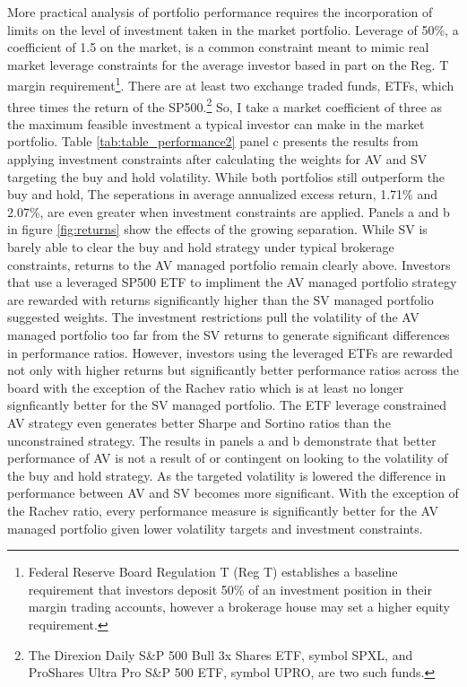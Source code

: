 More practical analysis of portfolio performance requires the incorporation of limits on the level of investment taken in the market portfolio. Leverage of 50\%, a coefficient of 1.5 on the market, is a common constraint meant to mimic real market leverage constraints for the average investor based in part on the Reg. T margin requirement\footnote{Federal Reserve Board Regulation T (Reg T) establishes a baseline requirement that investors deposit 50\% of an investment position in their margin trading accounts, however a brokerage house may set a higher equity requirement.}. \citep{Rapach2016,moreira_volatility-managed_2017,deuskar_margin_2017} There are at least two exchange traded funds, ETFs, which three times the return of the SP500.\footnote{The Direxion Daily S\&P 500 Bull 3x Shares ETF, symbol SPXL, and ProShares Ultra Pro S\&P 500 ETF, symbol UPRO, are two such funds.} So, I take a market coefficient of three as the maximum feasible investment a typical investor can make in the market portfolio. Table \ref{tab:table_performance2} panel c presents the results from applying investment constraints after calculating the weights for AV and SV targeting the buy and hold volatility. While both portfolios still outperform the buy and hold, The seperations in average annualized excess return, 1.71\% and 2.07\%, are even greater when investment constraints are applied. Panels a and b in figure \ref{fig:returns} show the effects of the growing separation. While SV is barely able to clear the buy and hold strategy under typical brokerage constraints, returns to the AV managed portfolio remain clearly above. Investors that use a leveraged SP500 ETF to impliment the AV managed portfolio strategy are rewarded with returns significantly higher than the SV managed portfolio suggested weights. The investment restrictions pull the volatility of the AV managed portfolio too far from the SV returns to generate significant differences in performance ratios. However, investors using the leveraged ETFs are rewarded not only with higher returns but significantly better performance ratios across the board with the exception of the Rachev ratio which is at least no longer signficantly better for the SV managed portfolio. The ETF leverage constrained AV strategy even generates better Sharpe and Sortino ratios than the unconstrained strategy. The results in panels a and b demonstrate that better performance of AV is not a result of or contingent on looking to the volatility of the buy and hold strategy. As the targeted volatility is lowered the difference in performance between AV and SV becomes more significant. With the exception of the Rachev ratio, every performance measure is significantly better for the AV managed portfolio given lower volatility targets and investment constraints.

